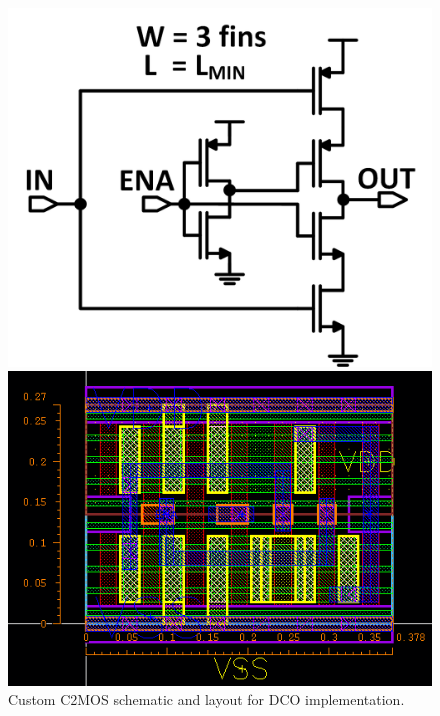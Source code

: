 \documentclass[twoside,9pt,journal,letterpage]{IEEEtran}
\begin{document}
\begin{figure}[h]
	\centering
	\begin{minipage}{0.49\columnwidth}
	\includegraphics[width=\textwidth]{fig_c2mossch}
	\end{minipage}
	\hfill
	\begin{minipage}{0.49\columnwidth}
	\includegraphics[width=\textwidth]{fig_c2moslayout}
	\end{minipage}
	\caption{Custom C2MOS schematic and layout for DCO implementation.}
	\label{fig:c2mos}
\end{figure}
\end{document}
